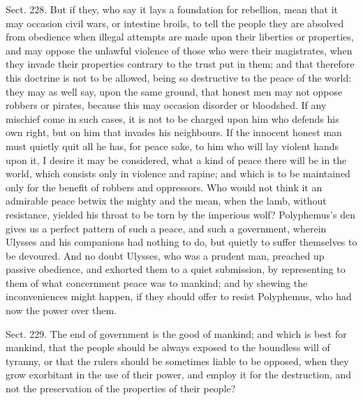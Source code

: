\documentclass[11pt,openany]{book}
\begin{document}
Sect. 228. But if they, who say it lays a foundation for rebellion, mean that it may occasion civil wars, or intestine broils, to tell the people they are absolved from obedience when illegal attempts are made upon their liberties or properties, and may oppose the unlawful violence of those who were their magistrates, when they invade their properties contrary to the trust put in them; and that therefore this doctrine is not to be allowed, being so destructive to the peace of the world: they may as well say, upon the same ground, that honest men may not oppose robbers or pirates, because this may occasion disorder or bloodshed. If any mischief come in such cases, it is not to be charged upon him who defends his own right, but on him that invades his neighbours. If the innocent honest man must quietly quit all he has, for peace sake, to him who will lay violent hands upon it, I desire it may be considered, what a kind of peace there will be in the world, which consists only in violence and rapine; and which is to be maintained only for the benefit of robbers and oppressors. Who would not think it an admirable peace betwix the mighty and the mean, when the lamb, without resistance, yielded his throat to be torn by the imperious wolf? Polyphemus's den gives us a perfect pattern of such a peace, and such a government, wherein Ulysses and his companions had nothing to do, but quietly to suffer themselves to be devoured. And no doubt Ulysses, who was a prudent man, preached up passive obedience, and exhorted them to a quiet submission, by representing to them of what concernment peace was to mankind; and by shewing the inconveniences might happen, if they should offer to resist Polyphemus, who had now the power over them.

Sect. 229. The end of government is the good of mankind; and which is best for mankind, that the people should be always exposed to the boundless will of tyranny, or that the rulers should be sometimes liable to be opposed, when they grow exorbitant in the use of their power, and employ it for the destruction, and not the preservation of the properties of their people?
\end{document}
